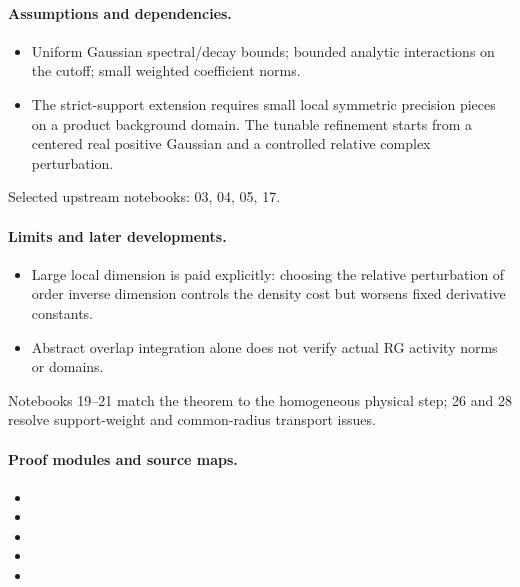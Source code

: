 \documentclass[11pt]{article}
\theoremstyle{remark}
\begin{document}
\paragraph{Assumptions and dependencies.}
\begin{itemize}
\item Uniform Gaussian spectral/decay bounds; bounded analytic interactions on the cutoff; small weighted coefficient norms.
\item The strict-support extension requires small local symmetric precision pieces on a product background domain. The tunable refinement starts from a centered real positive Gaussian and a controlled relative complex perturbation.
\end{itemize}

Selected upstream notebooks: 03, 04, 05, 17.\par

\paragraph{Limits and later developments.}
\begin{itemize}
\item Large local dimension is paid explicitly: choosing the relative perturbation of order inverse dimension controls the density cost but worsens fixed derivative constants.
\item Abstract overlap integration alone does not verify actual RG activity norms or domains.
\end{itemize}

Notebooks 19--21 match the theorem to the homogeneous physical step; 26 and 28 resolve support-weight and common-radius transport issues.

\paragraph{Proof modules and source maps.}
\begingroup\small
\begin{itemize}
\item {}
\item {}
\item {}
\item {}
\item {}
\end{itemize}
\endgroup
\end{document}
